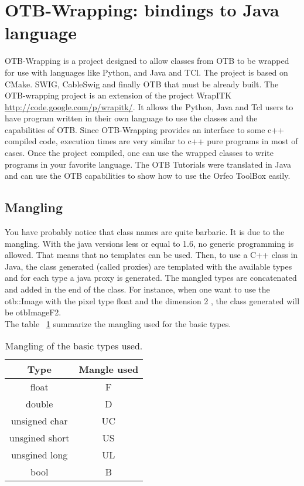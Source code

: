 \section{OTB-Wrapping: bindings to Java language}
OTB-Wrapping is a project designed to allow classes from OTB 
to be wrapped for use with languages like Python, and Java and TCl. 
The project is based on CMake. SWIG, CableSwig and finally OTB that must be already built.
 The OTB-wrapping project is an extension of the project WrapITK \url{http://code.google.com/p/wrapitk/}. 
It allows the Python, Java and Tcl users to have program written in their own language to use the classes and 
the capabilities of OTB.
Since OTB-Wrapping provides an interface to some c++ compiled code, execution times are very similar to c++ 
pure programs in most of cases.
Once the project compiled, one can use the wrapped classes to write programs in your favorite language.
The OTB Tutorials were translated in Java and can use the OTB capabilities to show how to use the 
Orfeo ToolBox easily. 

\subsection{Mangling}
You have probably notice that class names are quite barbaric. It is due to the mangling. 
With the java versions less or equal to 1.6, no generic programming is allowed. That means that no templates can be used. 
Then, to use a C++  class in Java, the class generated (called proxies) are templated with the available types and for each type a java proxy is generated. 
The mangled types are concatenated and added in the end of the class.
For instance, when one want to use the otb::Image with the pixel type float and the dimension 2 , the class generated will be otbImageF2. \\

The table ~\ref{tab:basictypetomangle} summarize the mangling used for the basic types. 

\begin{table}[!htbp]
\begin{center}
\begin{tabular}{|c|c|}
\hline
Type                  &  Mangle used  \\
\hline
float                 &  F         \\
double                &  D         \\
unsigned char         &  UC        \\
unsgined short        &  US        \\
unsgined long         &  UL        \\
bool                  &  B         \\

\hline 
\end{tabular}
\caption{Mangling of the basic types used.}\label{tab:basictypetomangle}
\end{center}
\end{table}

